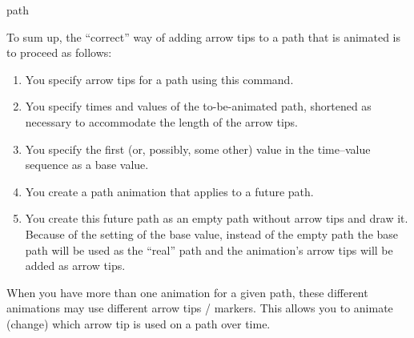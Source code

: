 \begin{sysanimateattribute}{path}
\begin{command}{\pgfsys@animation@tip@markers{}}
        To sum up, the ``correct'' way of adding arrow tips to a path that is
        animated is to proceed as follows:
        \begin{enumerate}
            \item You specify arrow tips for a path using this command.
            \item You specify times and values of the to-be-animated path,
                shortened as necessary to accommodate the length of the arrow
                tips.
            \item You specify the first (or, possibly, some other) value in the
                time--value sequence as a base value.
            \item You create a path animation that applies to a future path.
            \item You create this future path as an empty path without arrow
                tips and draw it. Because of the setting of the base value,
                instead of the empty path the base path will be used as the
                ``real'' path and the animation's arrow tips will be added as
                arrow tips.
        \end{enumerate}

        When you have more than one animation for a given path, these different
        animations may use different arrow tips / markers. This allows you to
        animate (change) which arrow tip is used on a path over time.
\begin{codeexample}[imagesource={standalone/pgfmanual-en-pgfsys-animations-animation-10.svg}]
\pgfsys@marker@declare{}%
\end{codeexample}
    \end{command}
\end{sysanimateattribute}

